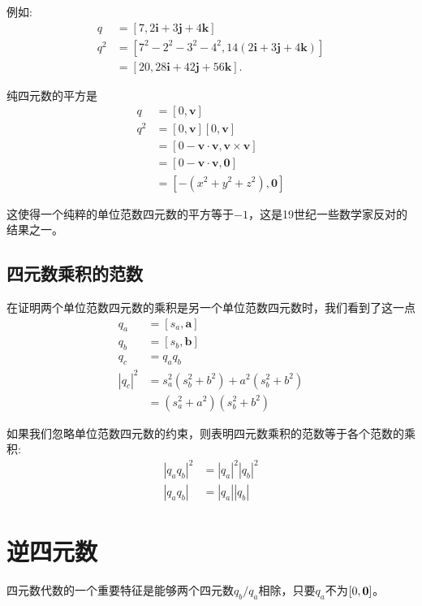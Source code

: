 例如:
$$
\begin{aligned}
q & =[7,2 \mathbf{i}+3 \mathbf{j}+4 \mathbf{k}] \\
q^{2} & =\left[7^{2}-2^{2}-3^{2}-4^{2}, 14(2 \mathbf{i}+3 \mathbf{j}+4 \mathbf{k})\right] \\
& =[20,28 \mathbf{i}+42 \mathbf{j}+56 \mathbf{k}] .
\end{aligned}
$$

纯四元数的平方是
$$
\begin{aligned}
q & =[0, \mathbf{v}] \\
q^{2} & =[0, \mathbf{v}][0, \mathbf{v}] \\
& =[0-\mathbf{v} \cdot \mathbf{v}, \mathbf{v} \times \mathbf{v}] \\
& =[0-\mathbf{v} \cdot \mathbf{v}, \mathbf{0}] \\
& =\left[-\left(x^{2}+y^{2}+z^{2}\right), \mathbf{0}\right]
\end{aligned}
$$

这使得一个纯粹的单位范数四元数的平方等于$-1$，这是19世纪一些数学家反对的结果之一。

\subsection{四元数乘积的范数}
在证明两个单位范数四元数的乘积是另一个单位范数四元数时，我们看到了这一点
$$
\begin{aligned}
q_{a} & =\left[s_{a}, \mathbf{a}\right] \\
q_{b} & =\left[s_{b}, \mathbf{b}\right] \\
q_{c} & =q_{a} q_{b} \\
\left|q_{c}\right|^{2} & =s_{a}^{2}\left(s_{b}^{2}+b^{2}\right)+a^{2}\left(s_{b}^{2}+b^{2}\right) \\
& =\left(s_{a}^{2}+a^{2}\right)\left(s_{b}^{2}+b^{2}\right)
\end{aligned}
$$

如果我们忽略单位范数四元数的约束，则表明四元数乘积的范数等于各个范数的乘积:
$$
\begin{aligned}
\left|q_{a} q_{b}\right|^{2} & =\left|q_{a}\right|^{2}\left|q_{b}\right|^{2} \\
\left|q_{a} q_{b}\right| & =\left|q_{a}\right|\left|q_{b}\right|
\end{aligned}
$$

\section{逆四元数}
四元数代数的一个重要特征是能够两个四元数$q_{b} / q_{a}$相除，只要$q_{a}$不为$[0,\bf{0}]$。


